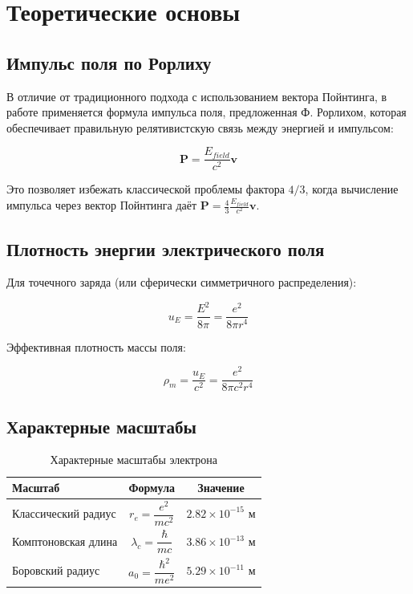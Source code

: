 \documentclass[12pt,a4paper]{article}
\begin{document}
\section{Теоретические основы}

\subsection{Импульс поля по Рорлиху}

В отличие от традиционного подхода с использованием вектора Пойнтинга, в работе применяется формула импульса поля, предложенная Ф. Рорлихом, которая обеспечивает правильную релятивистскую связь между энергией и импульсом:

\begin{equation}
    \mathbf{P} = \frac{E_{field}}{c^2} \mathbf{v}
\end{equation}

Это позволяет избежать классической проблемы фактора $4/3$, когда вычисление импульса через вектор Пойнтинга даёт $\mathbf{P} = \frac{4}{3} \frac{E_{field}}{c^2} \mathbf{v}$.

\subsection{Плотность энергии электрического поля}

Для точечного заряда (или сферически симметричного распределения):

\begin{equation}
    u_E = \frac{E^2}{8\pi} = \frac{e^2}{8\pi r^4}
\end{equation}

Эффективная плотность массы поля:

\begin{equation}
    \rho_m = \frac{u_E}{c^2} = \frac{e^2}{8\pi c^2 r^4}
\end{equation}

\subsection{Характерные масштабы}

\begin{table}[h]
\centering
\caption{Характерные масштабы электрона}
\label{tab:scales}
\begin{tabular}{lcc}
\toprule
\textbf{Масштаб} & \textbf{Формула} & \textbf{Значение} \\
\midrule
Классический радиус & $r_e = \dfrac{e^2}{m c^2}$ & $2.82 \times 10^{-15}$ м \\
Комптоновская длина & $\lambda_c = \dfrac{\hbar}{m c}$ & $3.86 \times 10^{-13}$ м \\
Боровский радиус & $a_0 = \dfrac{\hbar^2}{m e^2}$ & $5.29 \times 10^{-11}$ м \\
\bottomrule
\end{tabular}
\end{table}
\end{document}
